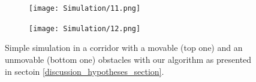 \begin{figure}[H]
\medskip

\begin{subfigure}{0.48\textwidth}
\texttt{[image: Simulation/11.png]}
\caption{} \label{fig:simulation_11}
\end{subfigure}\hspace*{\fill}
\begin{subfigure}{0.48\textwidth}
\texttt{[image: Simulation/12.png]}
\caption{} \label{fig:simulation_12}
\end{subfigure}

\caption{Simple simulation in a corridor with a movable (top one) and an unmovable (bottom one) obstacles with our algorithm as presented in sectoin \ref{discussion_hypotheses_section}.} \label{fig:simulation}
\end{figure}

